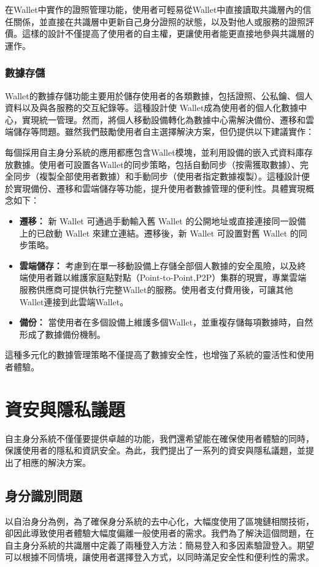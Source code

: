 在Wallet中實作的證照管理功能，使用者可輕易從Wallet中直接讀取共識層內的信任關係，並直接在共識層中更新自己身分證照的狀態，以及對他人或服務的證照評價。這樣的設計不僅提高了使用者的自主權，更讓使用者能更直接地參與共識層的運作。
\subsubsection{數據存儲}
Wallet的數據存儲功能主要用於儲存使用者的各類數據，包括證照、公私鑰、個人資料以及與各服務的交互紀錄等。這種設計使 Wallet成為使用者的個人化數據中心，實現統一管理。然而，將個人移動設備轉化為數據中心需解決備份、遷移和雲端儲存等問題。雖然我們鼓勵使用者自主選擇解決方案，但仍提供以下建議實作：

每個採用自主身分系統的應用都應包含Wallet模塊，並利用設備的嵌入式資料庫存放數據。使用者可設置各Wallet的同步策略，包括自動同步（按需獲取數據）、完全同步（複製全部使用者數據）和手動同步（使用者指定數據複製）。這種設計便於實現備份、遷移和雲端儲存等功能，提升使用者數據管理的便利性。具體實現概念如下：
\begin{itemize}
  \item \textbf{遷移：} 新 Wallet 可通過手動輸入舊 Wallet 的公開地址或直接連接同一設備上的已啟動 Wallet 來建立連結。遷移後，新 Wallet 可設置對舊 Wallet 的同步策略。
  \item \textbf{雲端儲存：} 考慮到在單一移動設備上存儲全部個人數據的安全風險，以及終端使用者難以維護家庭點對點（Point-to-Point,P2P）集群的現實，專業雲端服務供應商可提供執行完整Wallet的服務。使用者支付費用後，可讓其他 Wallet連接到此雲端Wallet。
  \item \textbf{備份：} 當使用者在多個設備上維護多個Wallet，並重複存儲每項數據時，自然形成了數據備份機制。
\end{itemize}
這種多元化的數據管理策略不僅提高了數據安全性，也增強了系統的靈活性和使用者體驗。
\section{資安與隱私議題}
自主身分系統不僅僅要提供卓越的功能，我們還希望能在確保使用者體驗的同時，保護使用者的隱私和資訊安全。為此，我們提出了一系列的資安與隱私議題，並提出了相應的解決方案。
\subsection{身分識別問題}
以自治身分為例，為了確保身分系統的去中心化，大幅度使用了區塊鏈相關技術，卻因此導致使用者體驗大幅度偏離一般使用者的需求。我們為了解決這個問題，在自主身分系統的共識層中定義了兩種登入方法：簡易登入和多因素驗證登入。期望可以根據不同情境，讓使用者選擇登入方式，以同時滿足安全性和便利性的需求。


